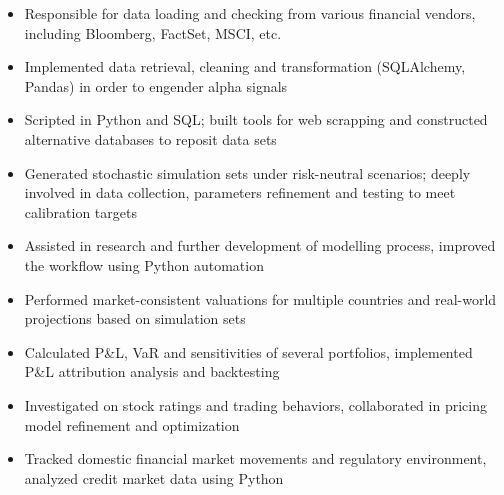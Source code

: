 \documentclass{resume}
\begin{document}
    \begin{itemize}
        \item Responsible for data loading and checking from various financial vendors, including Bloomberg, FactSet, MSCI, etc.
        \item Implemented data retrieval, cleaning and transformation (SQLAlchemy, Pandas) in order to engender alpha signals
        \item Scripted in Python and SQL; built tools for web scrapping and constructed alternative databases to reposit data sets
    \end{itemize}
    \begin{itemize}
        \item Generated stochastic simulation sets under risk-neutral scenarios; deeply involved in data collection, parameters refinement and testing to meet calibration targets
        \item Assisted in research and further development of modelling process, improved the workflow using Python automation
        \item Performed market-consistent valuations for multiple countries and real-world projections based on simulation sets
    \end{itemize}
    \begin{itemize}
        \item Calculated P\&L, VaR and sensitivities of several portfolios, implemented P\&L attribution analysis and backtesting
        \item Investigated on stock ratings and trading behaviors, collaborated in pricing model refinement and optimization
        \item Tracked domestic financial market movements and regulatory environment, analyzed credit market data using Python
    \end{itemize}
\end{document}
